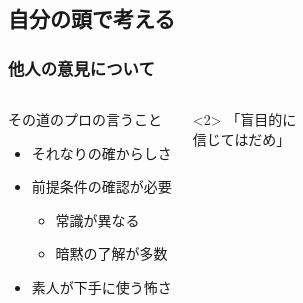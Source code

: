 \documentclass[12pt, dvipdfmx]{beamer}
\begin{document}
\subsection{自分の頭で考える}
\begin{frame}
    \frametitle{他人の意見について}
        \begin{columns}[c, onlytextwidth]
            \large
            \begin{block}{その道のプロの言うこと}
                \begin{itemize}
                    \large
                    \item それなりの確からしさ
                    \item 前提条件の確認が必要
                    \begin{itemize}
                        \large
                        \item 常識が異なる
                        \item 暗黙の了解が多数
                    \end{itemize}
                    \item 素人が下手に使う怖さ
                \end{itemize}
            \end{block}
            <2>
            \LARGE
                \alert{「盲目的に\\信じてはだめ」}
        \end{columns}
\end{frame}
\end{document}
